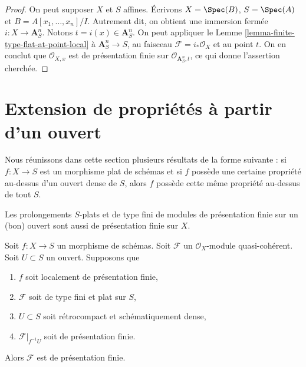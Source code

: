 \begin{proof}
On peut supposer $X$ et $S$ affines. Écrivons $X = \Spec(B)$,
$S = \Spec(A)$ et $B = A[x_1, \ldots, x_n]/I$.
Autrement dit, on obtient une immersion fermée $i : X \to \mathbf{A}^n_S$.
Notons $t = i(x) \in \mathbf{A}^n_S$. On peut appliquer
le Lemme \ref{lemma-finite-type-flat-at-point-local}
à $\mathbf{A}^n_S \to S$, au faisceau $\mathcal{F} = i_*\mathcal{O}_X$
et au point $t$. On en conclut que $\mathcal{O}_{X, x}$ est
de présentation finie sur $\mathcal{O}_{\mathbf{A}^n_S, t}$,
ce qui donne l'assertion cherchée.
\end{proof}







\section{Extension de propriétés à partir d'un ouvert}
\label{section-extending-properties}

\noindent
Nous réunissons dans cette section plusieurs résultats de la forme suivante : si $f : X \to S$
est un morphisme plat de schémas et si $f$ possède une certaine propriété au-dessus d'un
ouvert dense de $S$, alors $f$ possède cette même propriété au-dessus de tout $S$.

\begin{lemma}
\label{lemma-flat-finite-type-finitely-presented-over-dense-open}
\begin{slogan}
Les prolongements $S$-plats et de type fini de modules de présentation finie
sur un (bon) ouvert sont aussi de présentation finie sur $X$.
\end{slogan}
Soit $f : X \to S$ un morphisme de schémas. Soit $\mathcal{F}$ un
$\mathcal{O}_X$-module quasi-cohérent. Soit $U \subset S$ un ouvert.
Supposons que
\begin{enumerate}
\item $f$ soit localement de présentation finie,
\item $\mathcal{F}$ soit de type fini et plat sur $S$,
\item $U \subset S$ soit rétrocompact et schématiquement dense,
\item $\mathcal{F}|_{f^{-1}U}$ soit de présentation finie.
\end{enumerate}
Alors $\mathcal{F}$ est de présentation finie.
\end{lemma}

